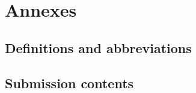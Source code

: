 \renewcommand{\documentname}{Annexes}

\chapter{Annexes}


\section{Definitions and abbreviations}

\section{Submission contents}

